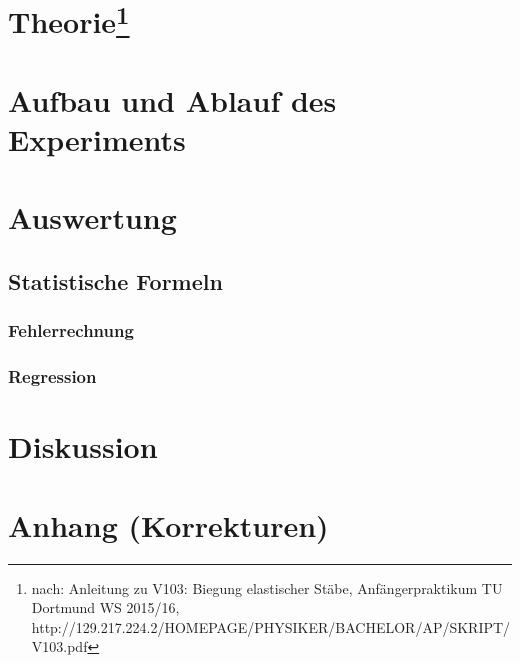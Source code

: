 \documentclass[a4,12pt]{article}
\begin{document}



\newpage
	\tableofcontents
\newpage

	\section[Theorie]{Theorie\footnote{nach: Anleitung zu V103: Biegung elastischer Stäbe, Anfängerpraktikum TU Dortmund WS 2015/16, http://129.217.224.2/HOMEPAGE/PHYSIKER/BACHELOR/AP/SKRIPT/V103.pdf}}
	
\newpage

	\section{Aufbau und Ablauf des Experiments}
	
\newpage

	\section{Auswertung}
	\subsection{Statistische Formeln}
	\subsubsection{Fehlerrechnung}
	
	\subsubsection{Regression}
	\label{sec:regression}
	
	\vspace{1cm}
	

\pagebreak
	\section{Diskussion}
	
\pagebreak
	\section{Anhang (Korrekturen)}
	
\end{document}
